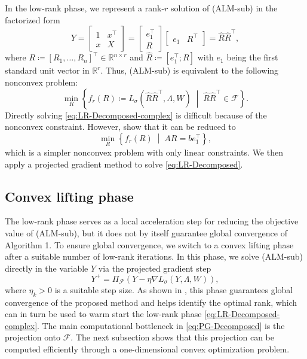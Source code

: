 \documentclass[11pt]{article}
\def\F{\mathcal{F}}
\def\R{\mathbb{R}}
\theoremstyle{plain}
\begin{document}
In the low-rank phase, we represent a rank-$r$ solution of (ALM-sub) in the factorized form
\[
Y=\begin{bmatrix} 1& x^\top\\ x & X\end{bmatrix}=\begin{bmatrix}
    e_1^\top\\R 
\end{bmatrix}\begin{bmatrix}
    e_1 & R^\top
\end{bmatrix} = \widehat{R}\widehat{R}^\top,
\]
where $R\coloneqq[R_1,\dots,R_n]^\top\in\R^{n\times r}$ and $\widehat{R}\coloneqq [e_1^\top;R]$ with $e_1$ being the first standard unit vector in $\R^r$. Thus, (ALM-sub) is equivalent to the following nonconvex problem:
\begin{equation}\label{eq:LR-Decomposed-complex}
\min_{R}\left\{
    f_r(R)\coloneq L_{\sigma}(\widehat{R}\widehat{R}^\top,\Lambda,W)
\;\middle|\;
\widehat R\widehat{R}^\top\in \F
\right\}.
\end{equation}
Directly solving \eqref{eq:LR-Decomposed-complex} is difficult because of the nonconvex constraint. However, \cite{RiNNAL,RiNNALplus} show that it can be reduced to
\begin{equation}\label{eq:LR-Decomposed}
\min_{R}\left\{
    f_r(R)
\;\middle|\;
AR=be_1^\top
\right\},
\end{equation}
which is a simpler nonconvex problem with only linear constraints. We then apply a projected gradient method to solve \eqref{eq:LR-Decomposed}.


\subsection{Convex lifting phase}\label{subsec:convex-lifting}

The low-rank phase serves as a local acceleration step for reducing the objective value of (ALM-sub), but it does not by itself guarantee global convergence of Algorithm 1. To ensure global convergence, we switch to a convex lifting phase after a suitable number of low-rank iterations. In this phase, we solve (ALM-sub) directly in the variable $Y$  via the projected gradient step
\begin{equation}\label{eq:PG-Decomposed}
Y^+=\Pi_{\F}\left(Y-\eta \nabla L_\sigma(Y,\Lambda,W)\right),
\end{equation}
where $\eta_k>0$ is a suitable step size. As shown in \cite{lee2022escaping,RiNNALPOP}, this phase guarantees global convergence of the proposed method and helps identify the optimal rank, which can in turn be used to warm start the low-rank phase
\eqref{eq:LR-Decomposed-complex}. The main computational bottleneck in \eqref{eq:PG-Decomposed} is the projection onto $\F$. The next subsection shows that this projection can be computed efficiently through a one-dimensional convex optimization problem.
\end{document}
